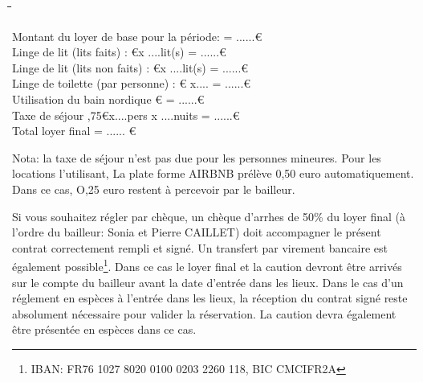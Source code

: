 \documentclass[a4paper,11pt]{article}
\begin{document}
\begin{tabbing}
  
 \hspace{6cm}\=  										\hspace{1cm}\=   	\hspace{4cm}\= 	\hspace{2cm}\= 		\hspace{2cm}\=	\kill


Montant du loyer de base pour la période: \>		\>		\>=			\>......\>\euro	   		\\
Linge de lit (lits faits) :			 					\euro		      			\>x ....lit(s)       				\>=  			\>......\>\euro				\\

Linge de lit (lits non faits) :			 					\euro		      			\>x ....lit(s)       				\>=  			\>......\>\euro				\\



Linge de toilette (par personne) :					 					\euro      				\> x....							\>=  			\>......\>\euro				\\

Utilisation du bain nordique \euro		\>		\>=			\>......\>\euro	   		\\

Taxe de séjour ,75\euro		\>x....pers x ....nuits		\>=			\>......\>\euro	   		\\

Total loyer final    										\>						\>  					\>=  							\>......					\>\euro			\\ 

 \end{tabbing}

Nota: la taxe de séjour n'est pas due pour les personnes mineures. Pour les locations l'utilisant, La plate forme AIRBNB prélève 0,50 euro  automatiquement. Dans ce cas, O,25 euro  restent à percevoir par le bailleur.


\vspace{0.5cm}

  
Si vous souhaitez régler par chèque, un chèque d'arrhes de 50\% du loyer final (à l'ordre du bailleur: Sonia et Pierre CAILLET)  doit accompagner le présent contrat correctement rempli et signé. 
Un transfert par virement bancaire est également possible\footnote{IBAN: FR76 1027 8020 0100 0203 2260 118, BIC CMCIFR2A}. Dans ce cas le loyer final et la caution devront être arrivés sur le compte du bailleur avant la date d'entrée dans les lieux.
Dans le cas d'un réglement en espèces à l'entrée dans les lieux, la réception du contrat signé reste absolument nécessaire pour valider la réservation. La caution devra également être présentée en espèces dans ce cas.
\end{document}
